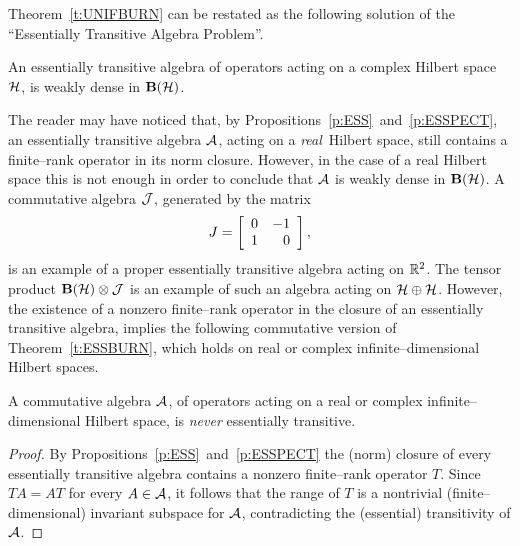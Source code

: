 \medskip

Theorem~\ref{t:UNIFBURN} can be restated as the following
solution of the ``Essentially Transitive Algebra Problem''.

\begin{thm}\label{t:ESSBURN}
An essentially transitive algebra of operators acting on a
complex Hilbert space ${\cal H}$, is weakly dense in $\mathbf B(\cal H)$.
\end{thm}

\begin{rem}
The reader may have noticed that, by
Propositions~\ref{p:ESS}~and~\ref{p:ESSPECT}, an essentially
transitive algebra ${\cal A}$, acting on a {\em real}\, Hilbert
space, still contains a finite--rank operator in its norm
closure. However, in the case of a real Hilbert space this is
not enough in order to conclude that ${\cal A}$ is weakly dense in
$\mathbf B(\cal H)$. A commutative algebra $\cal{J}$, generated by the matrix
\[ J= \left[ \begin{array}{r r}
      0 & -1 \\ 1 & 0
             \end{array} \right], \]
is an example of a proper essentially transitive algebra acting
on $\mathbb R^2$. The tensor product $\mathbf B(\cal H)\otimes\cal{J}$ is an
example of such an algebra acting on ${\cal H}\oplus{\cal H}$. However, the
existence of a nonzero finite--rank operator in the closure of
an essentially transitive algebra, implies the following
commutative version of Theorem~\ref{t:ESSBURN}, which holds on
real or complex infinite--dimensional Hilbert spaces.
\end{rem}

\medskip

\begin{thm}\label{t:COMBURN}
A commutative algebra ${\cal A}$, of operators acting on a real or
complex infinite--dimensional Hilbert space, is {\em never}
essentially transitive.
\end{thm}

\begin{proof}
By Propositions~\ref{p:ESS}~and~\ref{p:ESSPECT} the (norm)
closure of every essentially transitive algebra contains a
nonzero finite--rank operator $T$. Since $T{}A=A{}T$ for every
$A\in{\cal A}$, it follows that the range of $T$ is a nontrivial
(finite--dimensional) invariant subspace for ${\cal A}$,
contradicting the (essential) transitivity of ${\cal A}$.
\end{proof}

